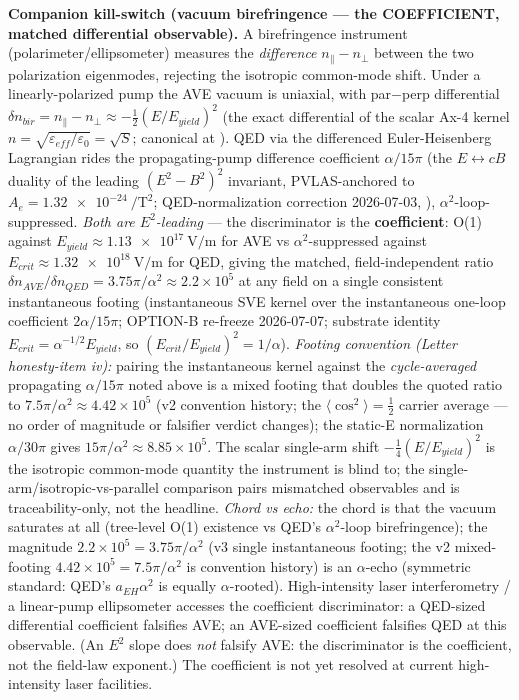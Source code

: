 \textbf{Companion kill-switch (vacuum birefringence --- the COEFFICIENT, matched differential observable).} A birefringence instrument (polarimeter/ellipsometer) measures the \emph{difference} $n_\parallel-n_\perp$ between the two polarization eigenmodes, rejecting the isotropic common-mode shift. Under a linearly-polarized pump the AVE vacuum is uniaxial, with par$-$perp differential $\delta n_{bir}=n_\parallel-n_\perp\approx-\tfrac12(E/E_{yield})^2$ (the exact differential of the scalar Ax-4 kernel $n=\sqrt{\varepsilon_{eff}/\varepsilon_0}=\sqrt{S}$; canonical at ). QED via the differenced Euler-Heisenberg Lagrangian rides the propagating-pump difference coefficient $\alpha/15\pi$ (the $E\leftrightarrow cB$ duality of the leading $(E^2-B^2)^2$ invariant, PVLAS-anchored to $A_e=\qty{1.32e-24}{\per\tesla\squared}$; QED-normalization correction 2026-07-03, ), $\alpha^2$-loop-suppressed. \emph{Both are $E^2$-leading} --- the discriminator is the \textbf{coefficient}: O(1) against $E_{yield}\approx\qty{1.13e17}{\volt\per\metre}$ for AVE vs $\alpha^2$-suppressed against $E_{crit}\approx\qty{1.32e18}{\volt\per\metre}$ for QED, giving the matched, field-independent ratio $\delta n_{AVE}/\delta n_{QED}=3.75\pi/\alpha^2\approx2.2\times10^5$ at any field on a single consistent instantaneous footing (instantaneous SVE kernel over the instantaneous one-loop coefficient $2\alpha/15\pi$; OPTION-B re-freeze 2026-07-07; substrate identity $E_{crit}=\alpha^{-1/2}E_{yield}$, so $(E_{crit}/E_{yield})^2=1/\alpha$). \emph{Footing convention (Letter honesty-item iv):} pairing the instantaneous kernel against the \emph{cycle-averaged} propagating $\alpha/15\pi$ noted above is a mixed footing that doubles the quoted ratio to $7.5\pi/\alpha^2\approx4.42\times10^5$ (v2 convention history; the $\langle\cos^2\rangle=\tfrac12$ carrier average --- no order of magnitude or falsifier verdict changes); the static-E normalization $\alpha/30\pi$ gives $15\pi/\alpha^2\approx8.85\times10^5$. The scalar single-arm shift $-\tfrac14(E/E_{yield})^2$ is the isotropic common-mode quantity the instrument is blind to; the single-arm/isotropic-vs-parallel comparison pairs mismatched observables and is traceability-only, not the headline. \emph{Chord vs echo:} the chord is that the vacuum saturates at all (tree-level O(1) existence vs QED's $\alpha^2$-loop birefringence); the magnitude $2.2\times10^5=3.75\pi/\alpha^2$ (v3 single instantaneous footing; the v2 mixed-footing $4.42\times10^5=7.5\pi/\alpha^2$ is convention history) is an $\alpha$-echo (symmetric standard: QED's $a_{EH}\alpha^2$ is equally $\alpha$-rooted). High-intensity laser interferometry / a linear-pump ellipsometer accesses the coefficient discriminator: a QED-sized differential coefficient falsifies AVE; an AVE-sized coefficient falsifies QED at this observable. (An $E^2$ slope does \emph{not} falsify AVE: the discriminator is the coefficient, not the field-law exponent.) The coefficient is not yet resolved at current high-intensity laser facilities.


